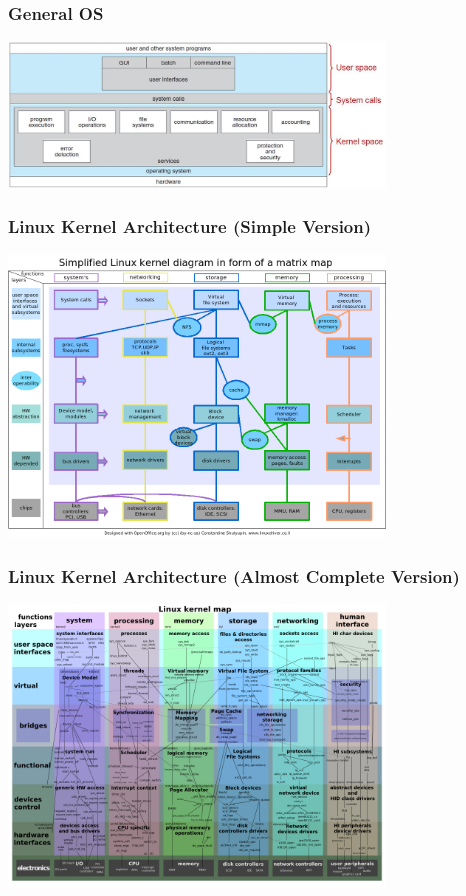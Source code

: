 \documentclass{beamer}
\begin{document}
\begin{frame}
	\frametitle{General OS}
	\vspace{.5cm}
	\begin{center}
	\includegraphics[width=10cm]{figs/os-components.jpg}
	\end{center}
\end{frame}

\begin{frame}
	\frametitle{Linux Kernel Architecture (Simple Version)}
	\begin{center}
	\includegraphics[width=10cm]{figs/Simple_Linux_kernel_diagram.png}	
	\end{center}
\end{frame}

\begin{frame}
	\frametitle{Linux Kernel Architecture (Almost Complete Version)}
	\begin{center}
	\includegraphics[width=10cm]{figs/Complex_Linux_kernel_map.png}	
	\end{center}
\end{frame}
\end{document}
